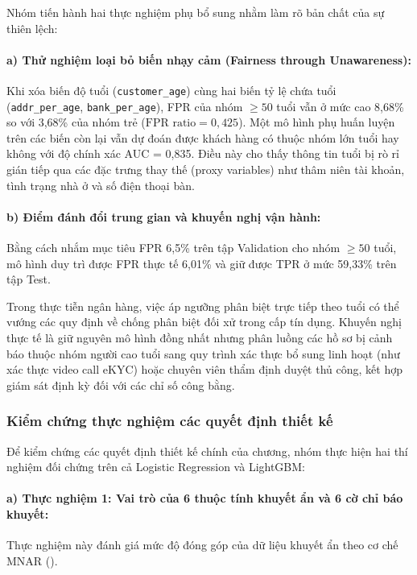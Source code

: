 Nhóm tiến hành hai thực nghiệm phụ bổ sung nhằm làm rõ bản chất của sự thiên lệch:

\paragraph{a) Thử nghiệm loại bỏ biến nhạy cảm (Fairness through Unawareness):}
Khi xóa biến độ tuổi (\texttt{customer\_age}) cùng hai biến tỷ lệ chứa tuổi (\texttt{addr\_per\_age}, \texttt{bank\_per\_age}), FPR của nhóm $\ge 50$ tuổi vẫn ở mức cao 8,68\% so với 3,68\% của nhóm trẻ ($\text{FPR ratio} = 0,425$). Một mô hình phụ huấn luyện trên các biến còn lại vẫn dự đoán được khách hàng có thuộc nhóm lớn tuổi hay không với độ chính xác AUC = 0,835. Điều này cho thấy thông tin tuổi bị rò rỉ gián tiếp qua các đặc trưng thay thế (proxy variables) như thâm niên tài khoản, tình trạng nhà ở và số điện thoại bàn.

\paragraph{b) Điểm đánh đổi trung gian và khuyến nghị vận hành:}
Bằng cách nhắm mục tiêu FPR 6,5\% trên tập Validation cho nhóm $\ge 50$ tuổi, mô hình duy trì được FPR thực tế 6,01\% và giữ được TPR ở mức 59,33\% trên tập Test.

Trong thực tiễn ngân hàng, việc áp ngưỡng phân biệt trực tiếp theo tuổi có thể vướng các quy định về chống phân biệt đối xử trong cấp tín dụng. Khuyến nghị thực tế là giữ nguyên mô hình đồng nhất nhưng phân luồng các hồ sơ bị cảnh báo thuộc nhóm người cao tuổi sang quy trình xác thực bổ sung linh hoạt (như xác thực video call eKYC) hoặc chuyên viên thẩm định duyệt thủ công, kết hợp giám sát định kỳ đối với các chỉ số công bằng.

\subsubsection{Kiểm chứng thực nghiệm các quyết định thiết kế}
Để kiểm chứng các quyết định thiết kế chính của chương, nhóm thực hiện hai thí nghiệm đối chứng trên cả Logistic Regression và LightGBM:

\paragraph{a) Thực nghiệm 1: Vai trò của 6 thuộc tính khuyết ẩn và 6 cờ chỉ báo khuyết:}
Thực nghiệm này đánh giá mức độ đóng góp của dữ liệu khuyết ẩn theo cơ chế MNAR ().

